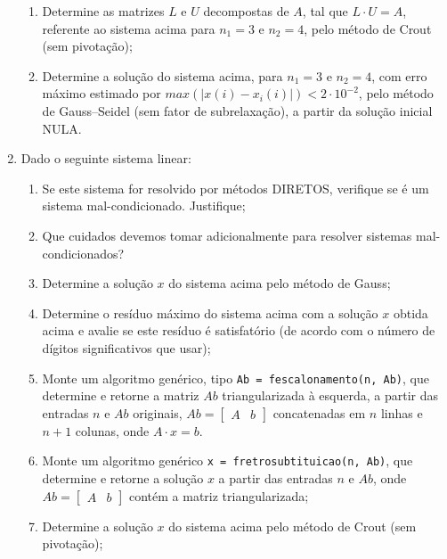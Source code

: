 \documentclass[12pt]{article}
\newenvironment{smallitem}{
    \vspace{-2mm}
    \begin{enumerate}
    \setlength{\parskip}{0pt}
    \setlength{\itemsep}{2pt}
}{
    \vspace{-2mm}
    \end{enumerate}
}
\begin{document}
\begin{enumerate}[label=\textbf{\arabic*})]
\begin{smallitem}
\item Determine as matrizes $L$ e $U$ decompostas de $A$, tal que $L \cdot U =
A$, referente ao sistema acima para $n_1 = 3$ e $n_2 = 4$, pelo método de Crout
(sem pivotação);

\item Determine a solução do sistema acima, para $n_1 = 3$ e $n_2 = 4$, com erro
máximo estimado por $max(\vert x(i)- x_i(i) \vert) < 2 \cdot 10^{-2}$, pelo
método de Gauss--Seidel (sem fator de subrelaxação), a partir da solução
inicial NULA.

\end{smallitem}

\item Dado o seguinte sistema linear:

\begin{smallitem}

\item Se este sistema for resolvido por métodos DIRETOS, verifique se é um
sistema mal-condicionado. Justifique;

\item Que cuidados devemos tomar adicionalmente para resolver sistemas mal-
condicionados?

\item Determine a solução $x$ do sistema acima pelo método de Gauss;

\item Determine o resíduo máximo do sistema acima com a solução $x$ obtida acima
e avalie se este resíduo é satisfatório (de acordo com o número de dígitos
significativos que usar);

\item Monte um algoritmo genérico, tipo \verb!Ab = fescalonamento(n, Ab)!, que
determine e retorne a matriz $Ab$ triangularizada à esquerda, a partir das
entradas $n$ e $Ab$ originais, $Ab = \begin{bmatrix} A & b \end{bmatrix}$
concatenadas em $n$ linhas e $n + 1$ colunas, onde $A \cdot x = b$.

\item Monte um algoritmo genérico \verb!x = fretrosubtituicao(n, Ab)!, que
determine e retorne a solução $x$ a partir das entradas $n$ e $Ab$, onde
$Ab = \begin{bmatrix} A & b \end{bmatrix}$ contém a matriz triangularizada;

\item Determine a solução $x$ do sistema acima pelo método de Crout (sem
pivotação);


\end{smallitem}
\end{enumerate}
\end{document}
